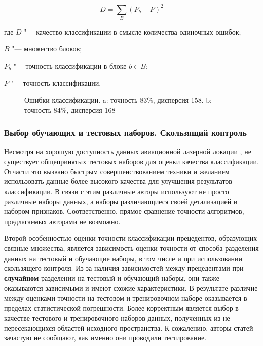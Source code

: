 $$
D=\sum_B(P_b-P)^2
$$
\begin{ESKDexplanation}
\item[где ] $D$ "--- качество классификации в смысле количества одиночных ошибок;
\item $B$ "--- множество блоков;
\item $P_b$ "--- точность классификации в блоке $b \in B$;
\item $P$ "--- точность классификации.
\end{ESKDexplanation}

\begin{figure}[h]
\centering
{}\qquad
{}
\caption{Ошибки классификации. a: точность 83\%, дисперсия 158. b: точность 84\%, дисперсия 168}
\end{figure}

\subsubsection{Выбор обучающих и тестовых наборов. Скользящий контроль}
\label{datasets abscense}
Несмотря на хорошую доступность данных авиационной лазерной локации \cite{national dataset}, не существует общепринятых тестовых наборов для оценки качества классификации. Отчасти это вызвано быстрым совершенствованием техники и желанием использовать данные более высокого качества для улучшения результатов классификации. В связи с этим различные авторы используют не просто различные наборы данных, а наборы различающиеся своей детализацией и набором признаков. Соответственно, прямое сравнение точности алгоритмов, предлагаемых авторами не возможно.

Второй особенностью оценки точности классификации прецедентов, образующих связные множества, является зависимость оценки точности от способа разделения данных на тестовый и обучающие наборы, в том числе и при использовании скользящего контроля. Из-за наличия зависимостей между прецедентами при \textbf{случайном} разделении на тестовый и обучающий наборы, они также оказываются зависимыми и имеют схожие характеристики. В результате различие между оценками точности на тестовом и тренировочном наборе оказывается в пределах статистической погрешности. Более корректным является выбор в качестве тестового и тренировочного наборов данных, полученных из не пересекающихся областей исходного пространства. К сожалению, авторы статей зачастую не сообщают, как именно они проводили тестирование.

